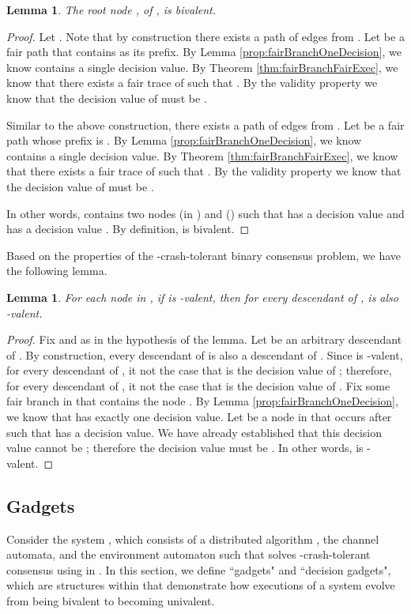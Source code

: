 \documentclass[11pt]{article}
\numberwithin{theorem}{section}
\newtheorem{lemma}[theorem]{Lemma}
\begin{document}
\begin{lemma}\label{prop:initialBivalent}
 The root node , of , is bivalent.
\end{lemma}
\begin{proof}
Let .
Note that by construction there exists a path  of edges from . Let  be a fair path that contains  as its prefix. By Lemma \ref{prop:fairBranchOneDecision}, we know  contains a single decision value. By Theorem \ref{thm:fairBranchFairExec}, we know that there exists a fair trace  of  such that  . By the validity property we know that the decision value of  must be .

Similar to the above construction, there exists a path  of edges from . Let  be a fair path whose prefix is . By Lemma \ref{prop:fairBranchOneDecision}, we know  contains a single decision value. By Theorem \ref{thm:fairBranchFairExec}, we know that there exists a fair trace  of  such that  . By the validity property we know that the decision value of  must be .

In other words,  contains two nodes  (in ) and  () such that  has a decision value  and  has a decision value . By definition,  is bivalent.
\end{proof}
Based on the properties of the -crash-tolerant binary consensus
problem, we have the following lemma.

\begin{lemma}\label{lem:univalentDescendentIsUnivalent}
For each node  in , if  is -valent, then for
every descendant  of ,  is also -valent.
\end{lemma}
\begin{proof}
Fix  and  as in the hypothesis of the lemma. Let  be an arbitrary descendant of . By construction, every descendant of  is also a descendant of . Since  is -valent, for every descendant  of , it not the case that  is the decision value of ; therefore, for every descendant  of , it not the case that  is the decision value of . Fix some fair branch  in  that contains the node . By Lemma \ref{prop:fairBranchOneDecision}, we know that  has exactly one decision value. Let  be a node in  that occurs after  such that  has a decision value. We have already established that this decision value cannot be ; therefore the decision value must be . In other words,  is -valent.
\end{proof}

\subsection{Gadgets}
Consider the system , which
consists of a distributed algorithm , the channel automata, and the environment automaton  such that solves -crash-tolerant
consensus using  in . In this section, we define ``gadgets" and ``decision gadgets", which are structures within  that demonstrate how executions
of a system  evolve from being bivalent to becoming
univalent.
\end{document}
